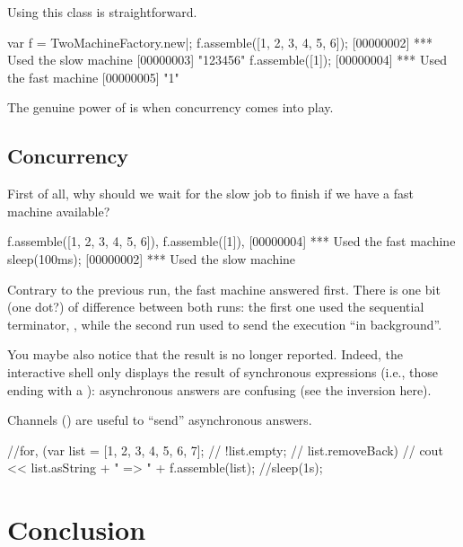 Using this class is straightforward.

\begin{urbiscript}
var f = TwoMachineFactory.new|;
f.assemble([1, 2, 3, 4, 5, 6]);
[00000002] *** Used the slow machine
[00000003] "123456"
f.assemble([1]);
[00000004] *** Used the fast machine
[00000005] "1"
\end{urbiscript}

The genuine power of \us is when concurrency comes into play.

\subsection{Concurrency}
%
%
%

First of all, why should we wait for the slow job to finish if we have
a fast machine available?

\begin{urbiscript}
f.assemble([1, 2, 3, 4, 5, 6]),
f.assemble([1]),
[00000004] *** Used the fast machine
sleep(100ms);
[00000002] *** Used the slow machine
\end{urbiscript}

Contrary to the previous run, the fast machine answered first.  There is one
bit (one dot?) of difference between both runs: the first one used the
sequential terminator, \samp{;}, while the second run used \samp{,} to send
the execution ``in background''.

You maybe also notice that the result is no longer reported.  Indeed, the
\us interactive shell only displays the result of synchronous expressions
(i.e., those ending with a \samp{;}): asynchronous answers are confusing
(see the inversion here).

Channels () are useful to ``send'' asynchronous answers.

\begin{urbiassert}
//for, (var list = [1, 2, 3, 4, 5, 6, 7];
//      !list.empty;
//      list.removeBack)
//  cout << list.asString + " => " + f.assemble(list);
//sleep(1s);
\end{urbiassert}

\section{Conclusion}



